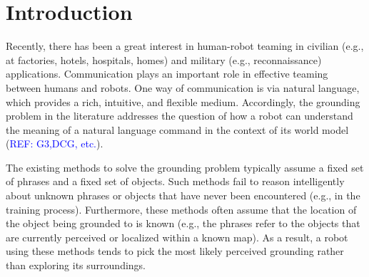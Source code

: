 \section{Introduction}
Recently, there has been a great interest in human-robot teaming in civilian (e.g., at factories, hotels, hospitals, homes) and military (e.g., reconnaissance) applications. Communication plays an important role in effective teaming between humans and robots. One way of communication is via natural language, which provides a rich, intuitive, and flexible medium. Accordingly, the grounding problem in the literature addresses the question of how a robot can understand the meaning of a natural language command in the context of its world model (\textcolor{blue}{REF: G3,DCG, etc.}). 

The existing methods to solve the grounding problem typically assume a fixed set of phrases and a fixed set of objects. Such methods fail to reason intelligently about unknown phrases or objects that have never been encountered (e.g., in the training process).
Furthermore, these methods often assume that the location of the object being grounded to is known (e.g., the phrases refer to the objects that are currently perceived or localized within a known map).
As a result, a robot using these methods tends to pick the most likely perceived grounding rather than exploring its surroundings.

